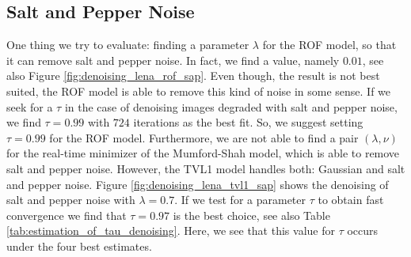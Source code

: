 \documentclass[abstracton]{scrreprt}
\begin{document}
        \subsection{Salt and Pepper Noise} %
        \label{sub:salt_and_pepper_noise}
            One thing we try to evaluate: finding a parameter $\lambda$ for the ROF model, so that it can remove salt and pepper noise. In fact, we find a value, namely $0.01$, see also Figure \ref{fig:denoising_lena_rof_sap}. Even though, the result is not best suited, the ROF model is able to remove this kind of noise in some sense. If we seek for a $\tau$ in the case of denoising images degraded with salt and pepper noise, we find $\tau = 0.99$ with $724$ iterations as the best fit. So, we suggest setting $\tau = 0.99$ for the ROF model. Furthermore, we are not able to find a pair $(\lambda, \nu)$ for the real-time minimizer of the Mumford-Shah model, which is able to remove salt and pepper noise. However, the TVL1 model handles both: Gaussian and salt and pepper noise. Figure \ref{fig:denoising_lena_tvl1_sap} shows the denoising of salt and pepper noise with $\lambda = 0.7$. If we test for a parameter $\tau$ to obtain fast convergence we find that $\tau = 0.97$ is the best choice, see also Table \ref{tab:estimation_of_tau_denoising}. Here, we see that this value for $\tau$ occurs under the four best estimates.\\\\
\end{document}
